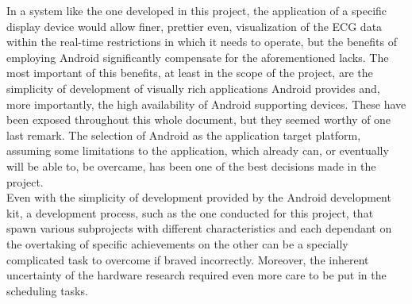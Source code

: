 		In a system like the one developed in this project, the application of a specific display device would allow finer, prettier even, visualization of the ECG data within the real-time restrictions in which it needs to operate, but the benefits of employing Android significantly compensate for the aforementioned lacks. The most important of this benefits, at least in the scope of the project, are the simplicity of development of visually rich applications Android provides and, more importantly, the high availability of Android supporting devices. These have been exposed throughout this whole document, but they seemed worthy of one last remark. The selection of Android as the application target platform, assuming some limitations to the application, which already can, or eventually will be able to, be overcame, has been one of the best decisions made in the project.\\

		Even with the simplicity of development provided by the Android development kit, a development process, such as the one conducted for this project, that spawn various subprojects with different characteristics and each dependant on the overtaking of specific achievements on the other can be a specially complicated task to overcome if braved incorrectly. Moreover, the inherent uncertainty of the hardware research required even more care to be put in the scheduling tasks.\\

